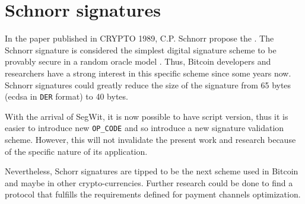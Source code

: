 
\section{Schnorr signatures}

In the paper 
published in CRYPTO 1989, C.P. Schnorr propose the  \cite{10.1007/0-387-34805-0_22}. The Schnorr signature is considered
the simplest digital signature scheme to be provably secure in a random oracle
model \cite{Bellare:1993:ROP:168588.168596, 10.1007/978-3-642-29011-4_33}. Thus,
Bitcoin developers and researchers have a strong interest in this specific
scheme since some years now. Schnorr signatures could greatly reduce the size of
the signature from 65 bytes (\gls{ecdsa} in \texttt{DER} format) to 40 bytes.

With the arrival of SegWit, it is now possible to have script version, thus it
is easier to introduce new \texttt{OP\_CODE} and so introduce a new signature
validation scheme. However, this will not invalidate the present work and
research because of the specific nature of its application.

Nevertheless, Schorr signatures are tipped to be the next scheme used in Bitcoin
and maybe in other crypto-currencies. Further research could be done to find a
protocol that fulfills the requirements defined for payment channels
optimization.
